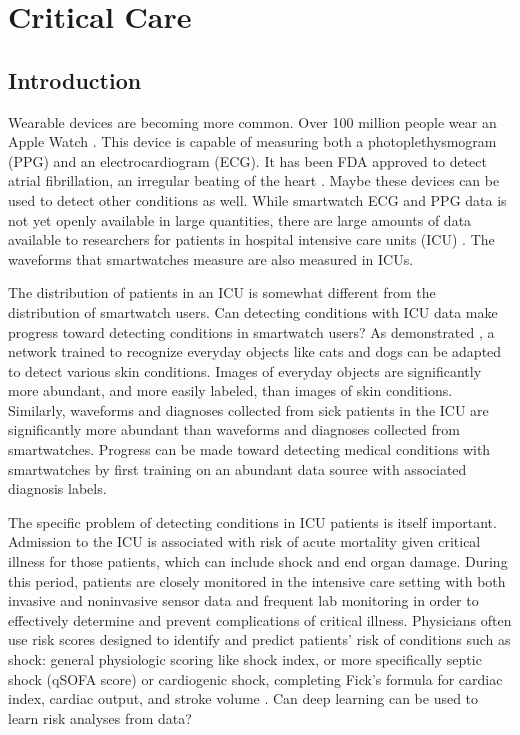 

\chapter{Critical Care}

\section{Introduction}
Wearable devices are becoming more common.  Over 100 million people wear an Apple Watch \cite{cybart_2021}.  This device is capable of measuring both a photoplethysmogram (PPG) and an electrocardiogram (ECG).  It has been FDA approved to detect atrial fibrillation, an irregular beating of the heart \cite{perez2019large}.  Maybe these devices can be used to detect other conditions as well.  While smartwatch ECG and PPG data is not yet openly available in large quantities, there are large amounts of data available to researchers for patients in hospital intensive care units (ICU) \cite{johnson2016mimic}.  The waveforms that smartwatches measure are also measured in ICUs.

The distribution of patients in an ICU is somewhat different from the distribution of smartwatch users.  Can detecting conditions with ICU data make progress toward detecting conditions in smartwatch users?  As demonstrated \cite{kuprel2017dermatologist}, a network trained to recognize everyday objects like cats and dogs can be adapted to detect various skin conditions.  Images of everyday objects are significantly more abundant, and more easily labeled, than images of skin conditions.  Similarly, waveforms and diagnoses collected from sick patients in the ICU are significantly more abundant than waveforms and diagnoses collected from smartwatches.  Progress can be made toward detecting medical conditions with smartwatches by first training on an abundant data source with associated diagnosis labels.  

The specific problem of detecting conditions in ICU patients is itself important.  Admission to the ICU is associated with risk of acute mortality given critical illness for those patients, which can include shock and end organ damage. During this period, patients are closely monitored in the intensive care setting with both invasive and noninvasive sensor data and frequent lab monitoring in order to effectively determine and prevent complications of critical illness.  Physicians often use risk scores designed to identify and predict patients’ risk of conditions such as shock: general physiologic scoring like shock index, or more specifically septic shock (qSOFA score) \cite{seymour2016assessment} or cardiogenic shock, completing Fick’s formula for cardiac index, cardiac output, and stroke volume \cite{fick1870ueber}.  Can deep learning can be used to learn risk analyses from data?

